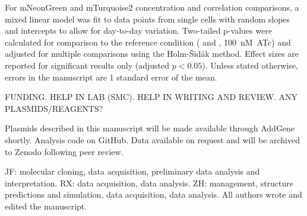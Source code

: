 \documentclass[pdflatex,sn-basic]{sn-jnl}%
\begin{document}
For mNeonGreen and mTurquoise2 concentration and correlation comparisons, a mixed linear model was fit to data points from single cells with random slopes and intercepts to allow for day-to-day variation. Two-tailed p-values were calculated for comparison to the reference condition (\permN{} and \ftsbdLQ{}, 100~nM~ATc) and adjusted for multiple comparisons using the Holm-Šidák method. Effect sizes are reported for significant results only (adjusted $p<0.05$). Unless stated otherwise, errors in the manuscript are 1 standard error of the mean.

\loremipsum{}

\backmatter


FUNDING. HELP IN LAB (SMC). HELP IN WRITING AND REVIEW. ANY PLASMIDS/REAGENTS?

Plasmids described in this manuscript will be made available through AddGene shortly.
Analysis code on GitHub.
Data available on request and will be archived to Zenodo following peer review.


JF: molecular cloning, data acquisition, preliminary data analysis and interpretation. RX: data acquisition, data analysis. ZH: management, structure predictions and simulation, data acquisition, data analysis. All authors wrote and edited the manuscript.

\end{document}
